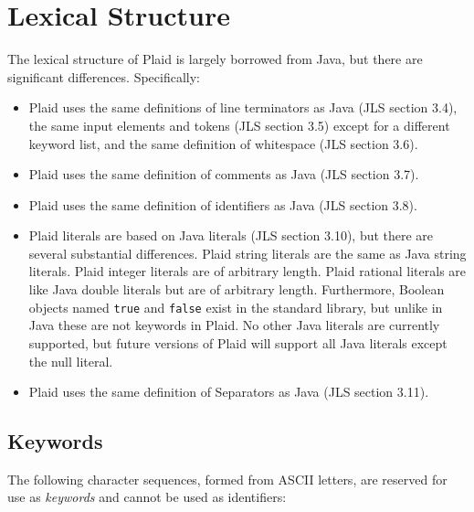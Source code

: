 \section{Lexical Structure}

The lexical structure of Plaid is largely borrowed from Java, but there are 
significant differences.  Specifically:

\begin{itemize}

\item Plaid uses the same definitions of line terminators as Java (JLS
  section 3.4), the same input elements and tokens (JLS section 3.5)
  except for a different keyword list, and the same definition of
  whitespace (JLS section 3.6).

\item Plaid uses the same definition of comments as Java (JLS section 3.7).

\item Plaid uses the same definition of identifiers as Java (JLS section 3.8).

\item Plaid literals are based on Java literals (JLS section
3.10), but there are several substantial differences. Plaid 
string literals are the same as Java string literals. 
Plaid integer literals are of arbitrary length. Plaid 
rational literals are like Java double literals but are of 
arbitrary length. Furthermore, Boolean objects named 
\texttt{true} and \texttt{false} exist in the standard library,
but unlike in Java these are not keywords in Plaid. No other 
Java literals are currently supported, but future versions 
of Plaid will support all Java literals except the null literal.
  
\item Plaid uses the same definition of Separators as Java (JLS section 3.11).

\end{itemize}


\subsection{Keywords}

The following character sequences, formed from ASCII letters, are reserved
for use as \textit{keywords} and cannot be used as identifiers:

